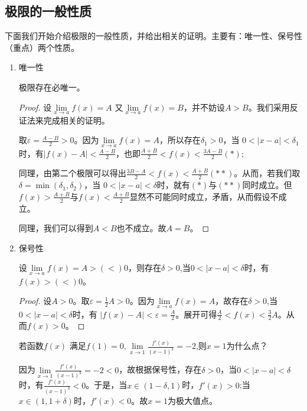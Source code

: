 \subsection{极限的一般性质}
下面我们开始介绍极限的一般性质，并给出相关的证明。主要有：唯一性、保号性（重点）两个性质。
\begin{enumerate}
    \item 唯一性
    \begin{property}
        极限存在必唯一。
    \end{property}
    
    \begin{proof}
    设$\lim\limits_{x \to a}f(x)=A $
    又$ \lim\limits_{x \to a}f(x)=B $，并不妨设$A>B$。我们采用反证法来完成相关的证明。
    
    取$ \varepsilon=\displaystyle\frac{A-B}{2}>0 $。因为$\lim\limits_{x \to a}f(x)=A $，所以存在$\delta_1>0 $，当 $0<\vert x-a\vert <\delta_1 $时，有$\vert{f(x)-A}\vert<\displaystyle\frac{A-B}{2}$，也即$\displaystyle\frac{A+B}{2}<f(x)<\frac{3A-B}{2}(*)$; 
    
    
    同理，由第二个极限可以得出$\displaystyle\frac{3B-A}{2}<f(x)<\displaystyle\frac{A+B}{2}(**)$。从而，若我们取$\delta=\min{(\delta_1,\delta_2)}$，当
    $ 0<\vert x-a\vert <\delta $时，就有$(*)$与$(**)$同时成立。但$f(x)>\displaystyle\frac{A+B}{2}$与$f(x)<\displaystyle\frac{A+B}{2}$显然不可能同时成立，矛盾，从而假设不成立。
    
    同理，我们可以得到$A<B$也不成立。故$A=B$。
    \end{proof}
    
    \item \FiveStar 保号性
    \begin{property}
        设$\lim\limits_{x \to a}f(x)=A>(<)0$，则存在$ \delta>0 $,当$ 0<\vert x-a\vert <\delta $时，有$f(x)>(<)0$。
    \end{property}
    \begin{proof}
        设$A>0$。取$\varepsilon=\displaystyle\frac{1}{2}A>0$。因为$\lim\limits_{x \to a}f(x)=A$，故存在$ \delta>0 $,当$ 0<\vert x-a\vert <\delta $时，有 $\vert{f(x)-A}\vert<\varepsilon=\displaystyle\frac{A}{2}$。展开可得$\displaystyle\frac{A}{2}<f(x)<\displaystyle\frac{3}{2}A$。从而$f(x)>0$。
    \end{proof}
    \begin{example}
       若函数$ f(x) $ 满足$ f(1)=0, \lim\limits_{x \to 1} \displaystyle\frac{f'(x)}{(x-1)^3}=-2 $,则$ x=1 $为什么点？
    \end{example}
    \begin{solution}
        因为$\lim\limits_{x \to 1}\displaystyle\frac{f'(x)}{(x-1)^3}=-2<0$，故根据保号性，存在$ \delta>0 $，当$ 0<\vert x-a\vert <\delta $时，有$\displaystyle\frac{f'(x)}{(x-1)^3}<0$。于是，当$x \in (1-\delta,1)$时，$f'(x)>0$;当$x \in (1,1+\delta)$时，$f'(x)<0$。故$x=1$为极大值点。
    \end{solution}
\end{enumerate}

